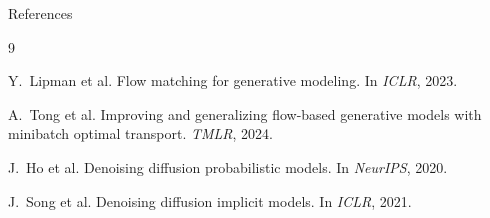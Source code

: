 \documentclass[aspectratio=169,10pt]{beamer}
\begin{document}
\begin{frame}{References}
\footnotesize
\begin{thebibliography}{9}

Y.~Lipman et al.
\newblock Flow matching for generative modeling.
\newblock In \emph{ICLR}, 2023.

A.~Tong et al.
\newblock Improving and generalizing flow-based generative models with minibatch optimal transport.
\newblock \emph{TMLR}, 2024.

J.~Ho et al.
\newblock Denoising diffusion probabilistic models.
\newblock In \emph{NeurIPS}, 2020.

J.~Song et al.
\newblock Denoising diffusion implicit models.
\newblock In \emph{ICLR}, 2021.

\end{thebibliography}
\end{frame}
\end{document}
